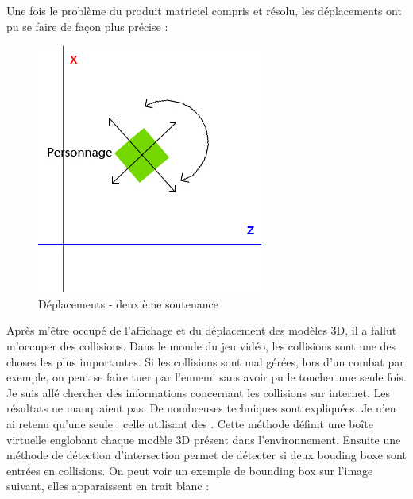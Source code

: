 \documentclass[12pt]{article}
\begin{document}
Une fois le problème du produit matriciel compris et résolu, les déplacements ont pu se faire de façon plus précise : 

\begin{figure}[h]
\begin{center}
\includegraphics[scale=0.5]{deplac2.jpg}
\caption{Déplacements - deuxième soutenance}
\end{center}
\end{figure}

Après m'être occupé de l'affichage et du déplacement des modèles 3D, il a fallut m'occuper des collisions. Dans le monde du jeu vidéo, les collisions sont une des choses les plus importantes. Si les collisions sont mal gérées, lors d'un combat par exemple, on peut se faire tuer par l'ennemi sans avoir pu le toucher une seule fois. Je suis allé chercher des informations concernant les collisions sur internet. Les résultats ne manquaient pas. De nombreuses techniques sont expliquées. Je n'en ai retenu qu'une seule : celle utilisant des . Cette méthode définit une boîte virtuelle englobant chaque modèle 3D présent dans l'environnement. Ensuite une méthode de détection d'intersection permet de détecter si deux bouding boxe sont entrées en collisions. On peut voir un exemple de bounding box sur l'image suivant, elles apparaissent en trait blanc : 
\end{document}
